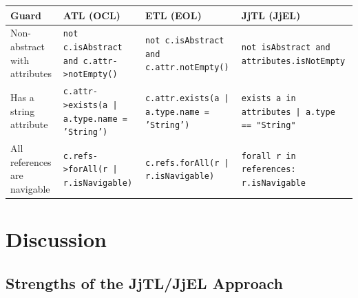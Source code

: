 \documentclass[11pt,a4paper]{article}
\begin{document}
\begin{center}
\small
\begin{tabularx}{\textwidth}{@{}p{2.8cm}XXX@{}}
\toprule
\textbf{Guard} & \textbf{ATL (OCL)} & \textbf{ETL (EOL)} & \textbf{JjTL (JjEL)} \\
\midrule
Non-abstract with attributes &
\texttt{not c.isAbstract and c.attr->notEmpty()} &
\texttt{not c.isAbstract and c.attr.notEmpty()} &
\texttt{not isAbstract and attributes.isNotEmpty} \\
\addlinespace
Has a string attribute &
\texttt{c.attr->exists(a | a.type.name = 'String')} &
\texttt{c.attr.exists(a | a.type.name = 'String')} &
\texttt{exists a in attributes | a.type == "String"} \\
\addlinespace
All references are navigable &
\texttt{c.refs->forAll(r | r.isNavigable)} &
\texttt{c.refs.forAll(r | r.isNavigable)} &
\texttt{forall r in references: r.isNavigable} \\
\bottomrule
\end{tabularx}
\end{center}


\section{Discussion}\label{sec:discussion}

\subsection{Strengths of the JjTL/JjEL Approach}
\end{document}
